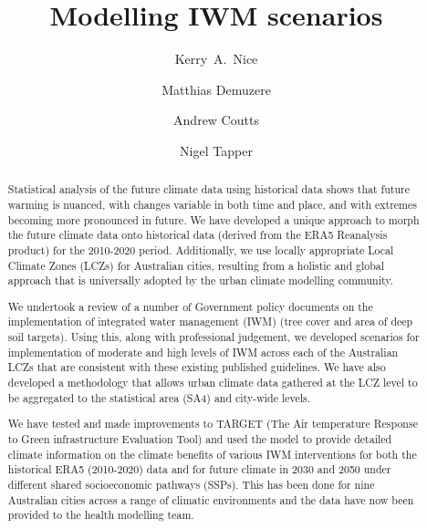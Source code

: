 \documentclass[final,3p,times,authoryear]{elsarticle}
\begin{document}
\title{Modelling IWM scenarios }

\author[melb]{Kerry~A.~Nice}
\author[ruhr]{Matthias Demuzere}
\author[monash]{Andrew Coutts}
\author[monash]{Nigel Tapper}
\address[melb]{Transport, Health, and Urban Design Hub, Faculty of Architecture, Building, and Planning, University of Melbourne, Australia.}
\address[ruhr]{Ruhr University Bochum, Germany.}
\address[monash]{School of Earth, Atmosphere and Environment, Monash University, Clayton, VIC 3800, Australia.}







\begin{abstract}

Statistical analysis of the future climate data using historical data shows that future warming is nuanced, with changes variable in both time and place, and with extremes becoming more pronounced in future. We have developed a unique approach to morph the future climate data onto historical data (derived from the ERA5 Reanalysis product) for the 2010-2020 period.  Additionally, we use locally appropriate Local Climate Zones (LCZs) for Australian cities, resulting from a holistic and global approach that is universally adopted by the urban climate modelling community. 

We undertook a review of a number of Government policy documents on the implementation of integrated water management (IWM) (tree cover and area of deep soil targets). Using this, along with professional judgement, we developed scenarios for implementation of moderate and high levels of IWM across each of the Australian LCZs that are consistent with these existing published guidelines. We have also developed a methodology that allows urban climate data gathered at the LCZ level to be aggregated to the statistical area (SA4) and city-wide levels.

We have tested and made improvements to TARGET (The Air temperature Response to Green infrastructure Evaluation Tool) and used the model to provide detailed climate information on the climate benefits of various IWM interventions for both the historical ERA5 (2010-2020) data and for future climate in 2030 and 2050 under different shared socioeconomic pathways (SSPs).  This has been done for nine Australian cities across a range of climatic environments and the data have now been provided to the health modelling team.

\end{abstract}
\end{document}
